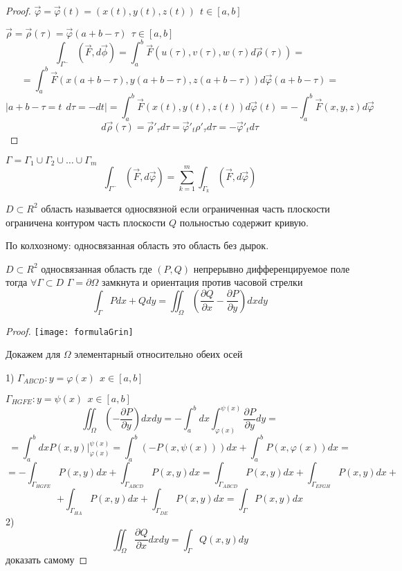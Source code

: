 \begin{proof}
  $\vec \varphi = \vec \varphi(t) = (x(t), y(t), z(t)) ~~ t \in [a,b]$

  $\vec \rho = \vec \rho (\tau) = \vec \varphi(a+b-\tau) ~~ \tau \in [a,b]$
  $$
  \int_{\Gamma^-}(\vec F, d\vec \phi) = \int_a^b \vec F(u(\tau), v(\tau),
  w(\tau)d\vec \rho (\tau)) =
  $$
  $$
  = \int_a^b \vec F(x(a+b-\tau),y(a+b-\tau),z(a+b-\tau))d\vec \varphi(a+b-\tau)
  =
  $$
  $$
  |a+b -\tau = t ~~ d\tau = -dt|
  = \int_a^b \vec F(x(t), y(t), z(t))d\vec \varphi(t) =
  - \int_a^b \vec F(x,y,z)d\vec\varphi
  $$
  $$
  d\vec \rho(\tau) = \vec \rho'_{\tau} d\tau = \vec \varphi'_t \rho'_{\tau}
  d\tau = -\vec \varphi'_t d\tau
  $$
\end{proof}

\begin{theorem}
  $\Gamma = \Gamma_1 \cup \Gamma_2 \cup \ldots \cup \Gamma_m$
  $$
  \int_{\Gamma^-} (\vec F, d\vec \varphi) = \sum_{k=1}^m \int_{\Gamma_k}
  (\vec F, d\vec \varphi)
  $$
\end{theorem}

\begin{define}
  $D \subset R^2$ область называется односвязной если ограниченная часть
  плоскости ограничена контуром часть плоскости $Q$ польностью содержит кривую.

  По колхозному: односвязанная область это область без дырок.
\end{define}

\begin{block}
  $D \subset R^2$ односвязанная область где $(P,Q)$ непрерывно дифференцируемое
  поле тогда $\forall \Gamma \subset D$ $\Gamma = \partial \Omega$ замкнута и
  ориентация против часовой стрелки
  $$
  \int_{\Gamma} Pdx + Qdy = \iint_{\Omega}  \left( \frac{\partial Q}{\partial x}
  - \frac{\partial P}{\partial y} \right) dxdy
  $$
\end{block}

\begin{proof}
  \texttt{[image: formulaGrin]}

  Докажем для $\Omega$ элементарный относительно обеих осей

  1)
  $\Gamma_{ABCD}: y = \varphi(x) ~~ x \in [a,b]$

  $\Gamma_{HGFE}: y = \psi(x) ~~ x \in [a,b]$
  $$
  \iint_{\Omega} \left( -\frac{\partial P}{\partial y} \right) dx dy =
  -\int_a^b dx \int_{\varphi(x)}^{\psi(x)} \frac{\partial P}{\partial y} dy =
  $$
  $$
  = \int_a^b dx P(x,y) |_{\varphi(x)}^{\psi(x)} = \int_a^b(-P(x, \psi(x)))dx +
  \int_a^b P(x, \varphi(x)) dx =
  $$
  $$
  = -\int_{\Gamma_{HGFE}} P(x, y) dx + \int_{\Gamma_{ABCD}} P(x,y)dx =
  \int_{\Gamma_{ABCD}} P(x,y)dx + \int_{\Gamma_{EFGH}} P(x,y)dx +
  $$
  $$
  + \int_{\Gamma_{HA}} P(x, y)dx + \int_{\Gamma_{DE}} P(x,y) dx =
  \int_{\Gamma} P(x,y) dx
  $$
  2)
  $$
  \iint_{\Omega} \frac{\partial Q}{\partial x} dx dy = \int_{\Gamma} Q(x,y)dy
  $$
  доказать самому
\end{proof}
